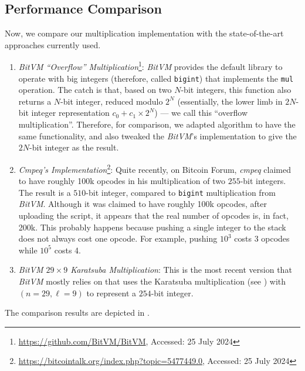 \documentclass{iacrtrans}
\begin{document}
\subsection{Performance Comparison}

Now, we compare our multiplication implementation with the state-of-the-art approaches currently used.

\begin{enumerate}
    \item \textit{BitVM ``Overflow'' Multiplication}\footnote{\url{https://github.com/BitVM/BitVM}, Accessed: 25 July 2024}: \textit{BitVM} provides the default library to operate with big integers (therefore, called \texttt{bigint}) that implements the \texttt{mul} operation. The catch is that, based on two $N$-bit integers, this function also returns a $N$-bit integer, reduced modulo $2^N$ (essentially, the lower limb in $2N$-bit integer representation $c_0 + c_1 \times 2^N$) --- we call this ``overflow multiplication''. Therefore, for comparison, we adapted algorithm  to have the same functionality, and also tweaked the \textit{BitVM}'s implementation to give the $2N$-bit integer as the result.
    \item \textit{Cmpeq's Implementation}\footnote{
    \url{https://bitcointalk.org/index.php?topic=5477449.0}, Accessed: 25 July 2024}: Quite recently, on Bitcoin Forum, \textit{cmpeq} claimed to have roughly \textsf{100k} opcodes in his multiplication of two $255$-bit integers. The result is a $510$-bit integer, compared to \texttt{bigint} multiplication from \textit{BitVM}. Although it was claimed to have roughly \textsf{100k} opcodes, after uploading the script, it appears that the real number of opcodes is, in fact, \textsf{200k}. This probably happens because pushing a single integer to the stack does not always cost one opcode. For example, pushing $10^3$ costs 3 opcodes while $10^5$ costs 4.
    \item \textit{BitVM $29\times 9$ Karatsuba Multiplication}: This is the most recent version that \textit{BitVM} mostly relies on that uses the Karatsuba multiplication (see ) with $(n=29,\ell=9)$ to represent a $254$-bit integer.
\end{enumerate}

The comparison results are depicted in .
\end{document}
